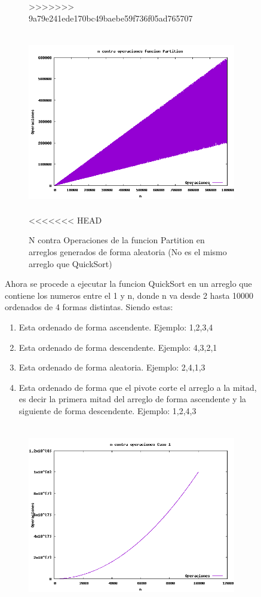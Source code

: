 \documentclass[spanish]{article}
\begin{document}
\begin{figure}[h!]
\begin{figure}[H]
>>>>>>> 9a79e241ede170bc49baebe59f736f05ad765707
	\end{figure}
	\begin{figure}[H]
		\centering
		\includegraphics[width=400px,height=300px]{grafica2}
<<<<<<< HEAD
		\caption{N contra Operaciones de la funcion Partition en arreglos generados de forma aleatoria (No es el mismo arreglo que QuickSort)}
	\end{figure}	
	Ahora se procede a ejecutar la funcion QuickSort en un arreglo que contiene los numeros entre el 1 y n, donde n va desde 2 hasta 10000 ordenados de 4 formas distintas. Siendo estas:\
	\begin{enumerate}
		\item Esta ordenado de forma ascendente. Ejemplo: 1,2,3,4
		\item Esta ordenado de forma descendente. Ejemplo: 4,3,2,1
		\item Esta ordenado de forma aleatoria. Ejemplo: 2,4,1,3
		\item Esta ordenado de forma que el pivote corte el arreglo a la mitad, es decir la primera mitad del arreglo de forma ascendente y la siguiente de forma descendente. Ejemplo: 1,2,4,3
	\end{enumerate}
	\begin{figure}[H]
		\centering
		\includegraphics[width=400px,height=300px]{grafica3}

\end{figure}
\end{figure}
\end{document}
